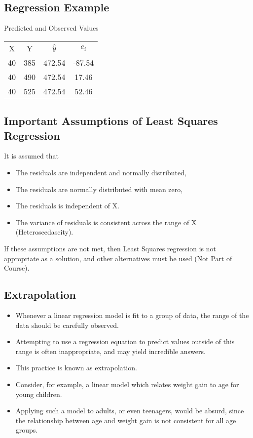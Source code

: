	
	
	\subsection{Regression Example}
	
	Predicted and Observed Values
	
	\begin{center}
		\begin{tabular}{|c|c|c|c|}
			\hline
			X & Y& $\hat{y}$ & $e_i$ \\
			40 &385 &472.54 &-87.54\\
			40 &490 &472.54 & 17.46\\
			40 &525 &472.54 & 52.46\\
			\hline
		\end{tabular}
	\end{center}
	
	
	
	\subsection{Important Assumptions of Least Squares Regression}
	It is assumed that
	\begin{itemize}
		\item The residuals are independent and normally distributed,
		\item The residuals are normally distributed with mean zero,
		\item The residuals is independent of X.
		\item The variance of residuals is consistent across the range of X (Heteroscedascity).
	\end{itemize}
	If these assumptions are not met, then Least Squares regression is not appropriate as a solution, and other alternatives must be used (Not Part of Course).
	
	
	\subsection{Extrapolation}
	\begin{itemize}
		\item
		Whenever a linear regression model is fit to a group of data, the range of the data should be carefully observed. \item  Attempting to use a regression equation to predict values outside of this range is often inappropriate, and may yield incredible answers. \item This practice is known as extrapolation. \item Consider, for example, a linear model which relates weight gain to age for young children. \item Applying such a model to adults, or even teenagers, would be absurd, since the relationship between age and weight gain is not consistent for all age groups.
	\end{itemize}
	
	

